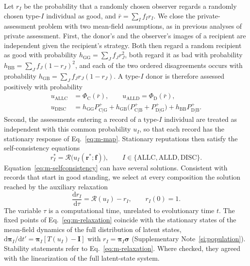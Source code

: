 \documentclass[fleqn,10pt]{wlscirep}
\newcommand{\Rmap}{\mathscr{R}}            %
\newcommand{\Pp}[1]{P^{+}_{\mathrm{#1}}}   %
\newcommand{\PhiC}{\Phi_{\mathrm{C}}}
\newcommand{\PhiD}{\Phi_{\mathrm{D}}}
\newcommand{\dd}{\mathrm{d}}
\newcommand{\ALLC}{\mathrm{ALLC}}
\newcommand{\ALLD}{\mathrm{ALLD}}
\newcommand{\DISC}{\mathrm{DISC}}
\theoremstyle{plain}
\begin{document}
Let $r_I$ be the probability that a randomly chosen observer regards a randomly chosen type-$I$ individual as good, and $\bar r=\sum_If_Ir_I$. We close the private-assessment problem with two mean-field assumptions, as in previous analyses of private assessment\cite{okada2018,radzvilavicius2019,kessinger2023,michelmata2024,kawakatsu2024}. First, the donor's and the observer's images of a recipient are independent given the recipient's strategy. Both then regard a random recipient as good with probability $h_{\mathrm{GG}}=\sum_Jf_Jr_J^2$, both regard it as bad with probability $h_{\mathrm{BB}}=\sum_Jf_J(1-r_J)^2$, and each of the two ordered disagreements occurs with probability $h_{\mathrm{GB}}=\sum_Jf_Jr_J(1-r_J)$. A type-$I$ donor is therefore assessed positively with probability
\begin{equation}
\begin{aligned}
u_{\ALLC}&=\PhiC(\bar r),\qquad u_{\ALLD}=\PhiD(\bar r),\\
u_{\DISC}&=h_{\mathrm{GG}}\Pp{C|G}+h_{\mathrm{GB}}\bigl(\Pp{C|B}+\Pp{D|G}\bigr)+h_{\mathrm{BB}}\Pp{D|B}.
\end{aligned}
\label{eq:m-u}
\end{equation}
Second, the assessments entering a record of a type-$I$ individual are treated as independent with this common probability $u_I$, so that each record has the stationary response of Eq.~\eqref{eq:m-map}. Stationary reputations then satisfy the self-consistency equations
\begin{equation}
r_I^*=\Rmap\bigl(u_I(\bm r^*;\bm f)\bigr),\qquad I\in\{\ALLC,\ALLD,\DISC\}.
\label{eq:m-selfconsistency}
\end{equation}
Equation~\eqref{eq:m-selfconsistency} can have several solutions. Consistent with records that start in good standing, we select at every composition the solution reached by the auxiliary relaxation
\begin{equation}
\frac{\dd r_I}{\dd\tau}=\Rmap(u_I)-r_I,\qquad r_I(0)=1.
\label{eq:m-relaxation}
\end{equation}
The variable $\tau$ is a computational time, unrelated to evolutionary time $t$. The fixed points of Eq.~\eqref{eq:m-relaxation} coincide with the stationary states of the mean-field dynamics of the full distribution of latent states, $\dd\bm\pi_I/\dd t'=\bm\pi_I[T(u_I)-\mathbf I]$ with $r_I=\bm\pi_I\bm\sigma$ (Supplementary Note~\ref{si:population}). Stability statements refer to Eq.~\eqref{eq:m-relaxation}. Where checked, they agreed with the linearization of the full latent-state system.
\end{document}
